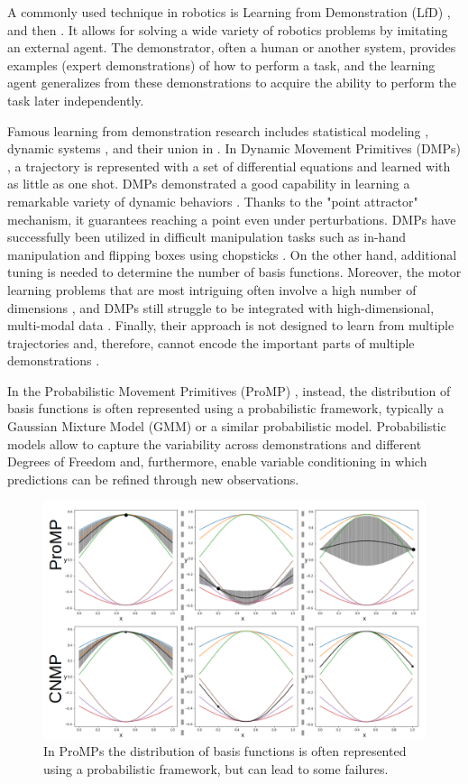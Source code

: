 A commonly used technique in robotics is Learning from Demonstration (LfD) \cite{ARGALL2009469} \cite{schaal1999imitation}, and then \cite{ravichandar2020recent}. It allows for solving a wide variety of robotics problems by imitating an external agent. The demonstrator, often a human or another system, provides examples (expert demonstrations) of how to perform a task, and the learning agent generalizes from these demonstrations to acquire the ability to perform the task later independently.

Famous learning from demonstration research includes statistical modeling \cite{calinon2016tutorial}, dynamic systems \cite{schaal2006dynamic}, and their union in \cite{ugur2020compliant}. In Dynamic Movement Primitives (DMPs) \cite{schaal2006dynamic} \cite{ijspeert2002learning}, a trajectory is represented with a set of differential equations and learned with as little as one shot. DMPs demonstrated a good capability in learning a remarkable variety of dynamic behaviors \cite{mulling2013learning}. Thanks to the "point attractor" mechanism, it guarantees reaching a point even under perturbations. DMPs have successfully been utilized in difficult manipulation tasks such as in-hand manipulation and flipping boxes using chopsticks \cite{pastor2009learning}. On the other hand, additional tuning is needed to determine the number of basis functions. Moreover, the motor learning problems that are most intriguing often involve a high number of dimensions \cite{kober2008policy}, and DMPs still struggle to be integrated with high-dimensional, multi-modal data \cite{saveriano2021dynamic}. Finally, their approach is not designed to learn from multiple trajectories and, therefore, cannot encode the important parts of multiple demonstrations \cite{Ugur-RSS-19}. 

In the Probabilistic Movement Primitives (ProMP) \cite{paraschos2013probabilistic}, instead, the distribution of basis functions is often represented using a probabilistic framework, typically a Gaussian Mixture Model (GMM) or a similar probabilistic model.  Probabilistic models allow to capture the variability across demonstrations and different Degrees of Freedom and, furthermore,  enable variable conditioning in which predictions can be refined through new observations.
\begin{figure}
	\centering
	\includegraphics[width=0.6\linewidth]{Images/ProMPvsCNMP.png}
	\caption{In ProMPs the distribution of basis functions is often represented using a probabilistic framework, but can lead to some failures.}
	\label{fig:prompcnmp}
\end{figure}

